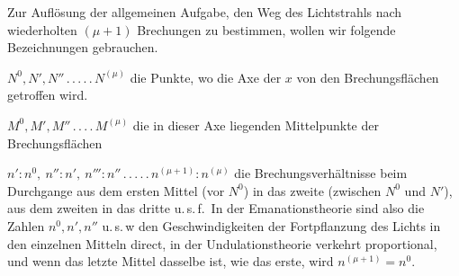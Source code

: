 Zur Auflösung der allgemeinen Aufgabe, den Weg des Lichtstrahls nach wiederholten $(\mu+1)$ Brechungen zu bestimmen, wollen wir folgende Bezeichnungen gebrauchen.

$N^0,N',N''\, .\, .\, .\, .\, .\, N^{(\mu)}$ die Punkte, wo die Axe der $x$ von den Brechungsflächen getroffen wird.

$M^0,M',M''\, .\, .\, .\, .\, M^{(\mu)}$ die in dieser Axe liegenden Mittelpunkte der Brechungsflächen

$n':n^0,\ n'':n',\ n''':n''\, .\, .\, .\, .\, .\, n^{(\mu+1)}:n^{(\mu)}$ die Brechungsverhältnisse beim Durchgange aus dem ersten Mittel (vor $N^0$) in das zweite (zwischen $N^0$ und $N'$), aus dem zweiten in das dritte u.\,s.\,f.\ In der Emanationstheorie sind also die Zahlen $n^0,n',n''$ u.\,s.\,w den Geschwindigkeiten der Fortpflanzung des Lichts in den einzelnen Mitteln direct, in der Undulationstheorie verkehrt proportional, und wenn das letzte Mittel dasselbe ist, wie das erste, wird $n^{(\mu+1)}=n^0$.

